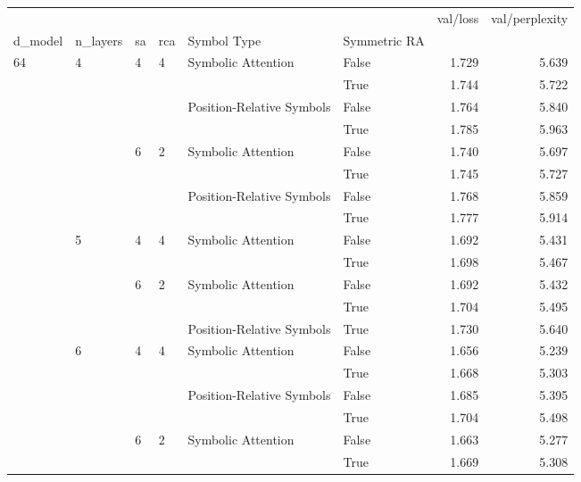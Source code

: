\begin{tabular}{llllllrr}
\toprule
    &   &   &   &                    &       &  val/loss &  val/perplexity \\
d\_model & n\_layers & sa & rca & Symbol Type & Symmetric RA &           &                 \\
\midrule
64  & 4 & 4 & 4 & Symbolic Attention & False &     1.729 &           5.639 \\
    &   &   &   &                    & True  &     1.744 &           5.722 \\
    &   &   &   & Position-Relative Symbols & False &     1.764 &           5.840 \\
    &   &   &   &                    & True  &     1.785 &           5.963 \\
    &   & 6 & 2 & Symbolic Attention & False &     1.740 &           5.697 \\
    &   &   &   &                    & True  &     1.745 &           5.727 \\
    &   &   &   & Position-Relative Symbols & False &     1.768 &           5.859 \\
    &   &   &   &                    & True  &     1.777 &           5.914 \\
    & 5 & 4 & 4 & Symbolic Attention & False &     1.692 &           5.431 \\
    &   &   &   &                    & True  &     1.698 &           5.467 \\
    &   & 6 & 2 & Symbolic Attention & False &     1.692 &           5.432 \\
    &   &   &   &                    & True  &     1.704 &           5.495 \\
    &   &   &   & Position-Relative Symbols & True  &     1.730 &           5.640 \\
    & 6 & 4 & 4 & Symbolic Attention & False &     1.656 &           5.239 \\
    &   &   &   &                    & True  &     1.668 &           5.303 \\
    &   &   &   & Position-Relative Symbols & False &     1.685 &           5.395 \\
    &   &   &   &                    & True  &     1.704 &           5.498 \\
    &   & 6 & 2 & Symbolic Attention & False &     1.663 &           5.277 \\
    &   &   &   &                    & True  &     1.669 &           5.308 \\

\end{tabular}
